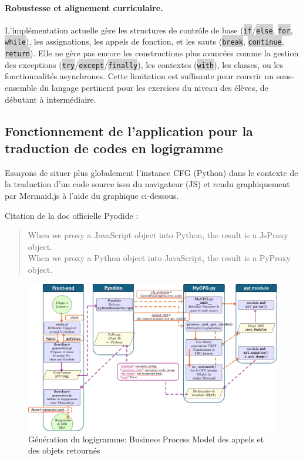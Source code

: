 \documentclass[11pt,a4paper]{article}
\let\cite\parencite
\newcommand{\code}[1]{\colorbox{lightgray}{\texttt{\small #1}}}
\begin{document}
\paragraph{Robustesse et alignement curriculaire.} L'implémentation actuelle gère les structures de contrôle de base (\code{if}/\code{else}, \code{for}, \code{while}), les assignations, les appels de fonction, et les sauts (\code{break}, \code{continue}, \code{return}). Elle ne gère pas encore les constructions plus avancées comme la gestion des exceptions (\code{try}/\code{except}/\code{finally}), les contextes (\code{with}), les classes, ou les fonctionnalités asynchrones. Cette limitation est suffisante pour couvrir un sous-ensemble du langage pertinent pour les exercices du niveau des élèves, de débutant à intermédiaire.

\subsection{Fonctionnement de l'application pour la traduction de codes en logigramme}

Essayons de situer plus globalement l'instance CFG (Python) dans le contexte de la traduction d'un code source issu du navigateur (JS) et rendu graphiquement par Mermaid.js à l'aide du graphique ci-dessous.

Citation de la doc officielle Pyodide \cite{pyodide}:
\begin{quote}
    When we proxy a JavaScript object into Python, the result is a JsProxy object.\\ When we proxy a Python object into JavaScript, the result is a PyProxy object.
\end{quote}

\begin{landscape}
\begin{figure}
    \centering
    \includegraphics[width=1.3\textwidth]{BPMN_process_logigramme.png}
    \caption{Génération du logigramme: Business Process Model des appels et des objets retournés}
    \label{bpmn}
\end{figure}
\end{landscape}
\end{document}
